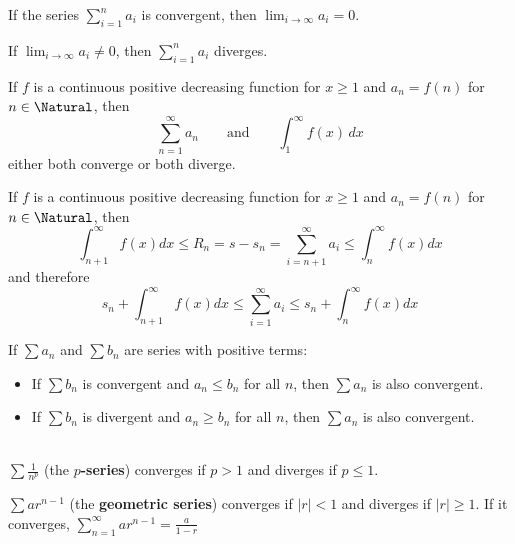 \begin{theorem} If the series $\sum_{i = 1}^n a_i$ is convergent, then $\lim_{i \to \infty} a_i = 0$.
\end{theorem}

\begin{theorem} If $\lim_{i \to \infty} a_i \neq 0$, then $\sum_{i = 1}^n a_i$ diverges.
\end{theorem}

\begin{theorem} If $f$ is a continuous positive decreasing function for $x \geq 1$ and $a_n = f(n)$ for $n \in \Natural$, then
  \[
    \sum_{n = 1}^\infty a_n \qquad \text{and} \qquad \int_1^\infty f(x) \,dx
  \]
    either both converge or both diverge.
\end{theorem}

\begin{theorem}If $f$ is a continuous positive decreasing function for $x \geq 1$ and $a_n = f(n)$ for $n \in \Natural$, then
  \[
    \int_{n+1}^\infty f(x) dx \leq R_n = s - s_n = \sum_{i = n+1}^\infty a_i \leq \int_{n}^\infty f(x) dx
  \]
  and therefore
  \[
    s_n + \int_{n+1}^\infty f(x) dx \leq \sum_{i = 1}^\infty a_i \leq s_n + \int_{n}^\infty f(x) dx
  \]
\end{theorem}

\begin{theorem} If $\sum a_n$ and $\sum b_n$ are series with positive terms:
  \begin{itemize}
    \item If $\sum b_n$ is convergent and $a_n \leq b_n$ for all $n$, then $\sum a_n$ is also convergent.
    \item If $\sum b_n$ is divergent and $a_n \geq b_n$ for all $n$, then $\sum a_n$ is also convergent.
  \end{itemize}
\end{theorem}

\begin{theorem} \ \\
  $\sum \frac{1}{n^p}$ (the \textbf{$p$-series}) converges if $p > 1$ and diverges if $p \leq 1$.

  $\sum ar^{n-1}$ (the \textbf{geometric series}) converges if $|r| < 1$ and diverges if $|r| \geq 1$. If it converges, $\displaystyle\sum_{n=1}^\infty ar^{n-1} = \frac{a}{1-r}$
\end{theorem}


